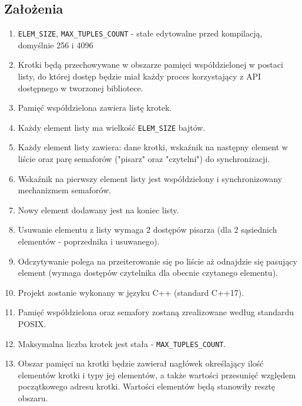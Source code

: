 \documentclass{article}
\begin{document}
	\subsection{Założenia}
	\begin{enumerate}
		\item \texttt{ELEM\_SIZE}, \texttt{MAX\_TUPLES\_COUNT} - stałe edytowalne przed kompilacją, domyślnie 256 i 4096
		\item Krotki będą przechowywane w obszarze pamięci współdzielonej w postaci listy, do której dostęp będzie miał każdy proces korzystający z API dostępnego w tworzonej bibliotece.
		\item Pamięć współdzielona zawiera listę krotek.
		\item Każdy element listy ma wielkość \texttt{ELEM\_SIZE} bajtów.
		\item Każdy element listy zawiera: dane krotki, wskaźnik na następny element w liście oraz parę semaforów ("pisarz" oraz "czytelni") do synchronizacji.
		\item Wskaźnik na pierwszy element listy jest współdzielony i synchronizowany mechanizmem semaforów.
		\item Nowy element dodawany jest na koniec listy.
		\item Usuwanie elementu z listy wymaga 2 dostępów pisarza (dla 2 sąsiednich elementów - poprzednika i usuwanego).
		\item Odczytywanie polega na przeiterowanie się po liście aż odnajdzie się pasujący element (wymaga dostępów czytelnika dla obecnie czytanego elementu).
		\item Projekt zostanie wykonany w języku C++ (standard C++17).
		\item Pamięć współdzielona oraz semafory zostaną zrealizowane według standardu POSIX.
		\item Maksymalna liczba krotek jest stała - \texttt{MAX\_TUPLES\_COUNT}.
		\item Obszar pamięci na krotki będzie zawierał nagłówek określający ilość elementów krotki i typy jej elementów, a także wartości przesunięć względem początkowego adresu krotki. Wartości elementów będą stanowiły resztę obszaru.
	\end{enumerate}
\end{document}
